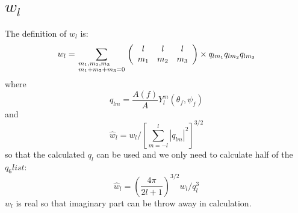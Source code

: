 \documentclass[12pt]{article}
\begin{document}
\section{$w_l$}
The definition of  $w_l$ \cite{steinhardtBondorientationalOrderLiquids1983} is:
\begin{equation*}
  {w_l} = \sum\limits_{\scriptstyle {m_1},{m_2},{m_3} \hfill \atop
  \scriptstyle {m_1} + {m_2} + {m_3} = 0 \hfill} {\left( {\begin{array}{*{20}{c}}
   l & l & l  \\
   {{m_1}} & {{m_2}} & {{m_3}}  \\
\end{array}} \right) \times {q_{l{m_1}}}{q_{l{m_2}}}{q_{l{m_3}}}}
\end{equation*}
where
\begin{equation*}
  q_{lm}=\frac{A(f)}{A}Y^{m}_{l}(\theta_f,\psi_f)
\end{equation*}
and
\begin{equation*}
  \hat{w}_l=w_l/[\sum_{m=-l}^{l}|q_{lm}|^2]^{3/2}
\end{equation*}
so that the calculated $q_l$ can be used and we only need to calculate half of the $q_6list$:
\begin{equation*}
  \hat{w}_l=(\frac{4\pi}{2l+1})^{3/2} w_l/ q_l^3
\end{equation*}
$w_l$ is real so that imaginary part can be throw away in calculation.

\medskip



\end{document}
